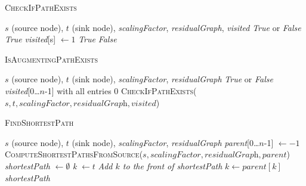 \documentclass{article}
\begin{document}
\begin{algorithm}[H]
\caption{\textcolor{keywordcolor}{\textsc{CheckIfPathExists}}}
\begin{algorithmic}[1]
\State {} $s$ (source node), $t$ (sink node), \textit{scalingFactor}, \textit{residualGraph}, \textit{visited}
\State {} \textit{True} or \textit{False}
    \State \Return \textit{True}
\EndIf
\State \textit{visited}[s] $\gets 1$
            \State \Return \textit{True}
        \EndIf
    \EndIf
\EndFor
\State \Return \textit{False}
\end{algorithmic}
\end{algorithm}

\begin{algorithm}[H]
\caption{\textcolor{keywordcolor}{\textsc{IsAugmentingPathExists}}}
\begin{algorithmic}[1]
\State {} $s$ (source node), $t$ (sink node), \textit{scalingFactor}, \textit{residualGraph}
\State {} \textit{True} or \textit{False}
\State {} \textit{visited}[0…$n$-1] with all entries 0
\State \Return \textcolor{identifiercolor}{\textsc{CheckIfPathExists}}($s, t, \textit{scalingFactor}, \textit{residualGraph}, \textit{visited}$)
\end{algorithmic}
\end{algorithm}

\begin{algorithm}[H]
\caption{\textcolor{keywordcolor}{\textsc{FindShortestPath}}}
\begin{algorithmic}[1]
\State {} $s$ (source node), $t$ (sink node), \textit{scalingFactor}, \textit{residualGraph}
\State {} \textit{parent}[0…$n$-1] $\gets -1$
\State \textcolor{identifiercolor}{\textsc{ComputeShortestPathsFromSource}}($s, \textit{scalingFactor}, \textit{residualGraph}, \textit{parent}$)
\State {} \textit{shortestPath} $\gets \emptyset$
\State \textit{k} $\gets t$
    \State \textit{Add $k$ to the front of shortestPath}
    \State $k \gets \textit{parent}[k]$
\EndWhile
\State \Return \textit{shortestPath}
\end{algorithmic}
\end{algorithm}
\end{document}
